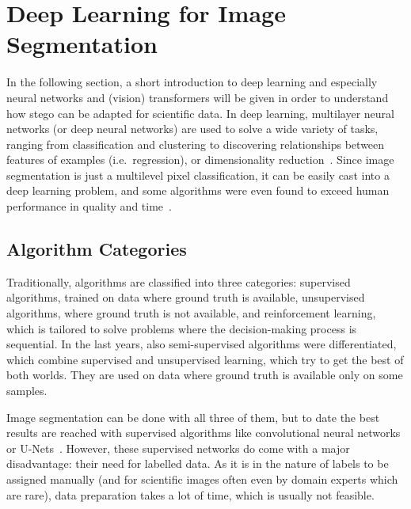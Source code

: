 \section{Deep Learning for Image Segmentation} \label{sec:deep-learning-and-neural-networks}
In the following section, a short introduction to deep learning and especially neural networks and (vision) transformers will be given in order to understand how \gls{stego} can be adapted for scientific data.
In deep learning, multilayer neural networks (or deep neural networks) are used to solve a wide variety of tasks, ranging from classification and clustering to discovering relationships between features of examples (i.e.\ regression), or dimensionality reduction~\autocite{Sarker2021}.
Since image segmentation is just a multilevel pixel classification, it can be easily cast into a deep learning problem, and some algorithms were even found to exceed human performance in quality and time~\autocite{Alzubaidi2021}.

\subsection{Algorithm Categories}
Traditionally, algorithms are classified into three categories:
supervised algorithms, trained on data where ground truth is available, unsupervised algorithms, where ground truth is not available, and reinforcement learning, which is tailored to solve problems where the decision-making process is sequential.
In the last years, also semi-super\-vised algorithms were differentiated, which combine supervised and unsupervised learning, which try to get the best of both worlds.
They are used on data where ground truth is available only on some samples.~\autocite{Burkov2019}

Image segmentation can be done with all three of them, but to date the best results are reached with supervised algorithms like convolutional neural networks or U-Nets~\autocite[e.g.][]{Isensee2019}.
However, these supervised networks do come with a major disadvantage: their need for labelled data.
As it is in the nature of labels to be assigned manually (and for scientific images often even by domain experts which are rare), data preparation takes a lot of time, which is usually not feasible.

